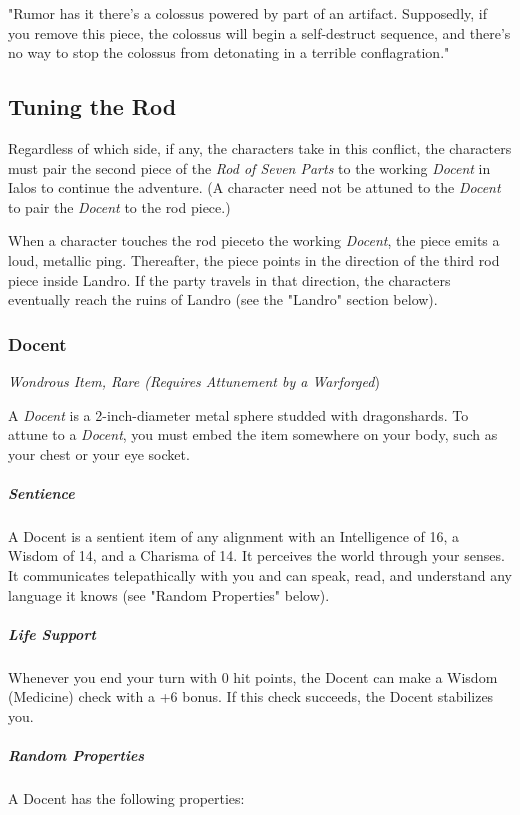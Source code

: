 \documentclass[10pt,a4paper,twoside,bg=print,twocolumn,openany,nodeprecatedcode]{dndbook}
\begin{document}
\begin{DndReadAloud}{}
"Rumor has it there's a colossus powered by part of an artifact. Supposedly, if you remove this piece, the colossus will begin a self-destruct sequence, and there's no way to stop the colossus from detonating in a terrible conflagration."

\end{DndReadAloud}

\subsection{Tuning the Rod}
Regardless of which side, if any, the characters take in this conflict, the characters must pair the second piece of the \textit{Rod of Seven Parts} to the working \textit{Docent} in Ialos to continue the adventure. (A character need not be attuned to the \textit{Docent} to pair the \textit{Docent} to the rod piece.)

When a character touches the rod pieceto the working \textit{Docent}, the piece emits a loud, metallic ping. Thereafter, the piece points in the direction of the third rod piece inside Landro. If the party travels in that direction, the characters eventually reach the ruins of Landro (see the "Landro" section below).

\subsubsection{Docent}
\textit{Wondrous Item, Rare (Requires Attunement by a Warforged})

A \textit{Docent} is a 2-inch-diameter metal sphere studded with dragonshards. To attune to a \textit{Docent}, you must embed the item somewhere on your body, such as your chest or your eye socket.

\subparagraph{Sentience}
A Docent is a sentient item of any alignment with an Intelligence of 16, a Wisdom of 14, and a Charisma of 14. It perceives the world through your senses. It communicates telepathically with you and can speak, read, and understand any language it knows (see "Random Properties" below).

\subparagraph{Life Support}
Whenever you end your turn with 0 hit points, the Docent can make a Wisdom (Medicine) check with a +6 bonus. If this check succeeds, the Docent stabilizes you.

\subparagraph{Random Properties}
A Docent has the following properties:
\end{document}

